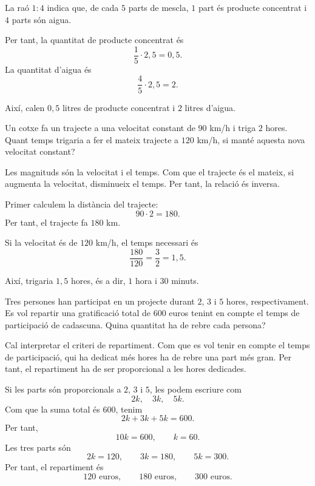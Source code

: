 \begin{solucio}
	La raó \(1:4\) indica que, de cada \(5\) parts de mescla, \(1\) part és producte concentrat i \(4\) parts són aigua.

	Per tant, la quantitat de producte concentrat és
	\[
		\frac{1}{5}\cdot2{,}5=0{,}5.
	\]
	La quantitat d'aigua és
	\[
		\frac{4}{5}\cdot2{,}5=2.
	\]

	Així, calen \(0{,}5\) litres de producte concentrat i \(2\) litres d'aigua.
\end{solucio}

\begin{exercici}
	Un cotxe fa un trajecte a una velocitat constant de \(90\) km/h i triga \(2\) hores. Quant temps trigaria a fer el mateix trajecte a \(120\) km/h, si manté aquesta nova velocitat constant?
\end{exercici}

\begin{solucio}
	Les magnituds són la velocitat i el temps. Com que el trajecte és el mateix, si augmenta la velocitat, disminueix el temps. Per tant, la relació és inversa.

	Primer calculem la distància del trajecte:
	\[
		90\cdot2=180.
	\]
	Per tant, el trajecte fa \(180\) km.

	Si la velocitat és de \(120\) km/h, el temps necessari és
	\[
		\frac{180}{120}=\frac{3}{2}=1{,}5.
	\]

	Així, trigaria \(1{,}5\) hores, és a dir, \(1\) hora i \(30\) minuts.
\end{solucio}

\begin{exercici}
	Tres persones han participat en un projecte durant \(2\), \(3\) i \(5\) hores, respectivament. Es vol repartir una gratificació total de \(600\) euros tenint en compte el temps de participació de cadascuna. Quina quantitat ha de rebre cada persona?
\end{exercici}

\begin{solucio}
	Cal interpretar el criteri de repartiment. Com que es vol tenir en compte el temps de participació, qui ha dedicat més hores ha de rebre una part més gran. Per tant, el repartiment ha de ser proporcional a les hores dedicades.

	Si les parts són proporcionals a \(2\), \(3\) i \(5\), les podem escriure com
	\[
		2k,	\quad 3k,	\quad 5k.
	\]
	Com que la suma total és \(600\), tenim
	\[
		2k+3k+5k=600.
	\]
	Per tant,
	\[
		10k=600,
		\qquad
		k=60.
	\]
	Les tres parts són
	\[
		2k=120,	\qquad 3k=180,	\qquad 5k=300.
	\]
	Per tant, el repartiment és
	\[
		120\text{ euros},\qquad 180\text{ euros},\qquad 300\text{ euros}.
	\]
\end{solucio}

